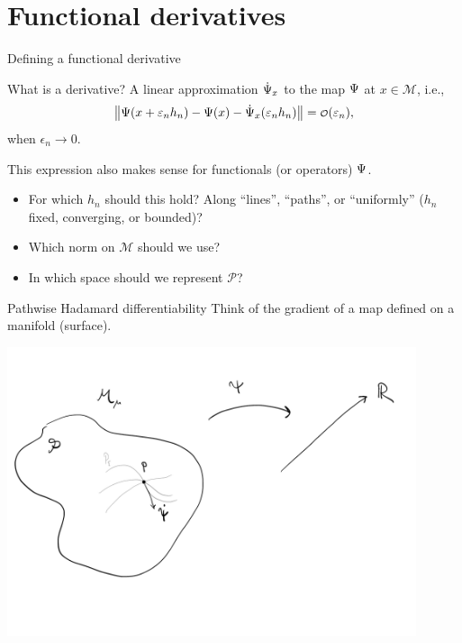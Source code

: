 \documentclass{beamer}\usepackage{listings}
\begin{document}
\section{Functional derivatives}
\label{sec:org522c4de}
\begin{frame}[label={sec:orgf25950a}]{Defining a functional derivative}
\begin{block}{What is a derivative? \pause}
A linear approximation \(\dot{\operatorname{\Psi}}_x\) to the map \(\operatorname{\Psi}\) at \(x \in \mathcal{M}\), i.e.,
\begin{equation*}
  \left\Vert
    \TT(x + \epsilon_n h_n) - \TT(x) - \dot{\TT}_x(\epsilon_n h_n)
  \right\Vert = \smallO(\epsilon_n),
\end{equation*}
when \(\epsilon_n \rightarrow 0\).

\pause \hfill
\end{block}
This expression also makes sense for functionals (or operators) \(\operatorname{\Psi}\).

\pause \hfill

\begin{itemize}[<+->]
\item For which \(h_n\) should this hold? Along ``lines'', ``paths'', or ``uniformly'' (\(h_n\) fixed,
converging, or bounded)?
\item Which norm on \(\mathcal{M}\) should we use?
\item In which space should we represent \(\mathcal{P}\)?
\end{itemize}
\end{frame}

\begin{frame}[label={sec:orgfa39af5}]{Pathwise Hadamard differentiability}
Think of the gradient of a map defined on a manifold (surface).

\begin{center}
\includegraphics[width=0.9\textwidth]{./figures/pathwise-dif.pdf}
\end{center}
\end{frame}
\end{document}
